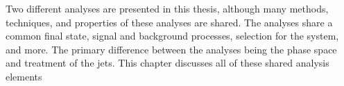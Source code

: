 
Two different analyses are presented in this thesis, although many methods,
techniques, and properties of these analyses are shared.
The analyses share a common final state, signal and background processes,
selection for the \Zy system, and more. The primary difference between the
analyses being the phase space and treatment of the jets.
This chapter discusses all of these shared analysis elements


